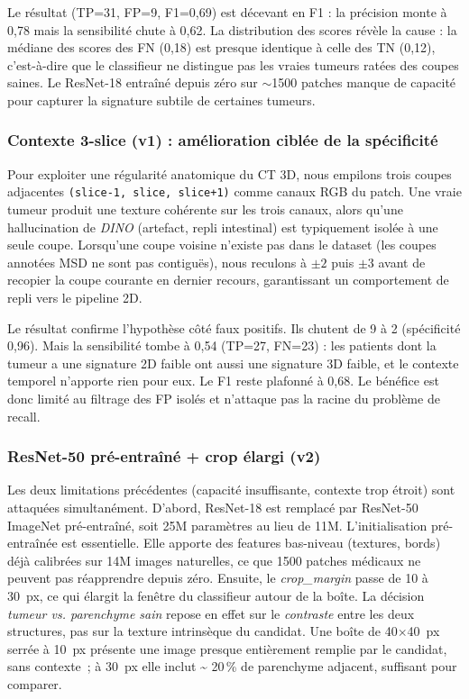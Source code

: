\documentclass{article}
\begin{document}
Le r\'esultat (TP=31, FP=9, F1=0{,}69) est d\'ecevant en F1 : la pr\'ecision
monte \`a 0{,}78 mais la sensibilit\'e chute \`a 0{,}62. La distribution des
scores r\'ev\`ele la cause : la m\'ediane des scores des FN (0{,}18) est
presque identique \`a celle des TN (0{,}12), c'est-\`a-dire que le classifieur
ne distingue pas les vraies tumeurs rat\'ees des coupes saines. Le ResNet-18
entra\^in\'e depuis z\'ero sur $\sim$1500 patches manque de capacit\'e pour
capturer la signature subtile de certaines tumeurs.

\subsubsection{Contexte 3-slice (v1) : am\'elioration cibl\'ee de la sp\'ecificit\'e}
Pour exploiter une r\'egularit\'e anatomique du CT 3D, nous empilons trois
coupes adjacentes \texttt{(slice-1, slice, slice+1)} comme canaux RGB du
patch. Une vraie tumeur produit une texture coh\'erente sur les trois canaux,
alors qu'une hallucination de \emph{DINO} (artefact, repli intestinal) est
typiquement isol\'ee \`a une seule coupe. Lorsqu'une coupe voisine n'existe
pas dans le dataset (les coupes annot\'ees MSD ne sont pas contigu\"es), nous
reculons \`a $\pm 2$ puis $\pm 3$ avant de recopier la coupe courante en
dernier recours, garantissant un comportement de repli vers le pipeline 2D.

Le r\'esultat confirme l'hypoth\`ese c\^ot\'e faux positifs. Ils chutent de
9 \`a 2 (sp\'ecificit\'e 0{,}96). Mais la sensibilit\'e tombe \`a 0{,}54
(TP=27, FN=23) : les patients dont la tumeur a une signature 2D faible ont
aussi une signature 3D faible, et le contexte temporel n'apporte rien pour
eux. Le F1 reste plafonn\'e \`a 0{,}68. Le b\'en\'efice est donc limit\'e au
filtrage des FP isol\'es et n'attaque pas la racine du probl\`eme de recall.

\subsubsection{ResNet-50 pr\'e-entra\^in\'e + crop \'elargi (v2)}
Les deux limitations pr\'ec\'edentes (capacit\'e insuffisante, contexte trop
\'etroit) sont attaqu\'ees simultan\'ement. D'abord, ResNet-18 est remplac\'e
par ResNet-50 ImageNet pr\'e-entra\^in\'e, soit 25M param\`etres au lieu de
11M. L'initialisation pr\'e-entra\^in\'ee est essentielle. Elle apporte des
features bas-niveau (textures, bords) d\'ej\`a calibr\'ees sur 14M images
naturelles, ce que 1500 patches m\'edicaux ne peuvent pas r\'eapprendre depuis
z\'ero. Ensuite, le \emph{crop\_margin} passe de 10 \`a 30~px, ce qui \'elargit
la fen\^etre du classifieur autour de la bo\^ite. La d\'ecision \emph{tumeur
vs. parenchyme sain} repose en effet sur le \emph{contraste} entre les deux
structures, pas sur la texture intrins\`eque du candidat. Une bo\^ite de
40$\times$40~px serr\'ee \`a 10~px pr\'esente une image presque enti\`erement
remplie par le candidat, sans contexte~; \`a 30~px elle inclut \textasciitilde
20\,\% de parenchyme adjacent, suffisant pour comparer.
\end{document}

